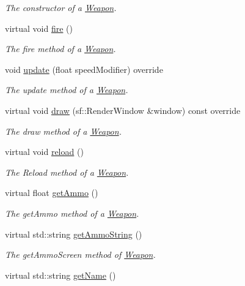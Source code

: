 \begin{DoxyCompactItemize}
\begin{DoxyCompactList}\small\item\em The constructor of a \hyperlink{class_weapon}{Weapon}. \end{DoxyCompactList}\item 
virtual void \hyperlink{class_weapon_af6f8ab97e28fd4778f97c96c78fd02f4}{fire} ()
\begin{DoxyCompactList}\small\item\em The fire method of a \hyperlink{class_weapon}{Weapon}. \end{DoxyCompactList}\item 
void \hyperlink{class_weapon_a098b1074ff1099e9fbd83d1186b8f18f}{update} (float speed\+Modifier) override
\begin{DoxyCompactList}\small\item\em The update method of a \hyperlink{class_weapon}{Weapon}. \end{DoxyCompactList}\item 
virtual void \hyperlink{class_weapon_acb2e13733d27dec0a15845c359bf68a6}{draw} (sf\+::\+Render\+Window \&window) const override
\begin{DoxyCompactList}\small\item\em The draw method of a \hyperlink{class_weapon}{Weapon}. \end{DoxyCompactList}\item 
virtual void \hyperlink{class_weapon_ae02c48b932b0327382c5dd1672079590}{reload} ()
\begin{DoxyCompactList}\small\item\em The Reload method of a \hyperlink{class_weapon}{Weapon}. \end{DoxyCompactList}\item 
virtual float \hyperlink{class_weapon_a2286ebc74825dd4b03d9981eb968e602}{get\+Ammo} ()
\begin{DoxyCompactList}\small\item\em The get\+Ammo method of a \hyperlink{class_weapon}{Weapon}. \end{DoxyCompactList}\item 
virtual std\+::string \hyperlink{class_weapon_ae412d66702a05b0a0d5d6c026ee3f8d3}{get\+Ammo\+String} ()
\begin{DoxyCompactList}\small\item\em The get\+Ammo\+Screen method of \hyperlink{class_weapon}{Weapon}. \end{DoxyCompactList}\item 
virtual std\+::string \hyperlink{class_weapon_a0cc1adfac060d480dbb6d10b96de0a0d}{get\+Name} ()

\end{DoxyCompactItemize}
